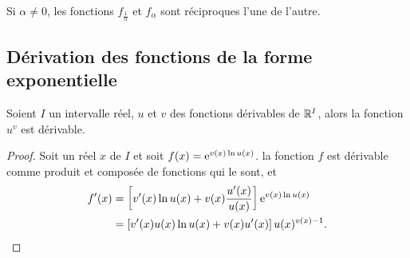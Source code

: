 Si $\alpha \neq 0$, les fonctions $f_{\frac{1}{\alpha}}$ et $f_\alpha$ sont réciproques l'une de l'autre.
%
\subsection{Dérivation des fonctions de la forme exponentielle}
\label{subsec:chap1-derivationdesfonctionsdelaformeexponentielle}
\begin{prop}
  Soient $I$ un intervalle réel, $u$ et $v$ des fonctions dérivables de $\mathbb{R}^{I}$, alors la fonction $u^v$ est dérivable.
\end{prop}
\begin{proof}
  Soit un réel $x$ de $I$ et soit $f(x)=\operatorname{e}^{v(x) \ln u(x)}$. la fonction $f$ est dérivable comme produit et composée de fonctions qui le sont, et
  \begin{align}
    f'(x) &=\left[ v'(x) \ln u(x) + v(x) \frac{u'(x)}{u(x)} \right]\operatorname{e}^{v(x) \ln u(x)} \\
    &= \left[v'(x)u(x)\ln u(x) + v(x) u'(x) \right]u(x)^{v(x)-1}.
  \end{align}
\end{proof}
%
